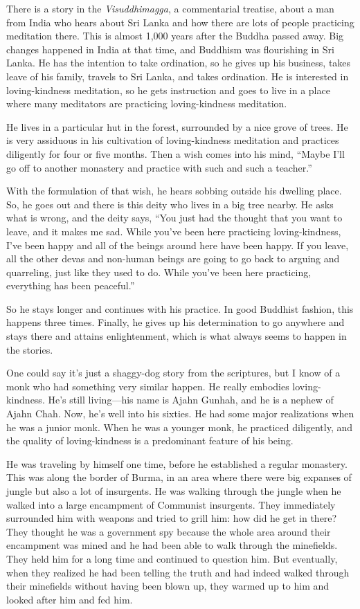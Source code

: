 There is a story in the \emph{Visuddhimagga}, a commentarial treatise,
about a man from India who hears about Sri Lanka and how there are lots
of people practicing meditation there. This is almost 1,000 years after
the Buddha passed away. Big changes happened in India at that time, and
Buddhism was flourishing in Sri Lanka. He has the intention to take
ordination, so he gives up his business, takes leave of his family,
travels to Sri Lanka, and takes ordination. He is interested in
loving-kindness meditation, so he gets instruction and goes to live in a
place where many meditators are practicing loving-kindness meditation.

He lives in a particular hut in the forest, surrounded by a nice grove
of trees. He is very assiduous in his cultivation of loving-kindness
meditation and practices diligently for four or five months. Then a wish
comes into his mind, “Maybe I’ll go off to another monastery and
practice with such and such a teacher.”

With the formulation of that wish, he hears sobbing outside his dwelling
place. So, he goes out and there is this deity who lives in a big tree
nearby. He asks what is wrong, and the deity says, “You just had the
thought that you want to leave, and it makes me sad. While you’ve been
here practicing loving-kindness, I’ve been happy and all of the beings
around here have been happy. If you leave, all the other devas and
non-human beings are going to go back to arguing and quarreling, just
like they used to do. While you’ve been here practicing, everything has
been peaceful.”

So he stays longer and continues with his practice. In good Buddhist
fashion, this happens three times. Finally, he gives up his
determination to go anywhere and stays there and attains enlightenment,
which is what always seems to happen in the stories.

One could say it’s just a shaggy-dog story from the scriptures, but I
know of a monk who had something very similar happen. He really embodies
loving-kindness. He’s still living—his name is Ajahn Gunhah, and he is a
nephew of Ajahn Chah. Now, he’s well into his sixties. He had some major
realizations when he was a junior monk. When he was a younger monk, he
practiced diligently, and the quality of loving-kindness is a
predominant feature of his being.

He was traveling by himself one time, before he established a regular
monastery. This was along the border of Burma, in an area where there
were big expanses of jungle but also a lot of insurgents. He was walking
through the jungle when he walked into a large encampment of Communist
insurgents. They immediately surrounded him with weapons and tried to
grill him: how did he get in there? They thought he was a government spy
because the whole area around their encampment was mined and he had been
able to walk through the minefields. They held him for a long time and
continued to question him. But eventually, when they realized he had
been telling the truth and had indeed walked through their minefields
without having been blown up, they warmed up to him and looked after him
and fed him.

